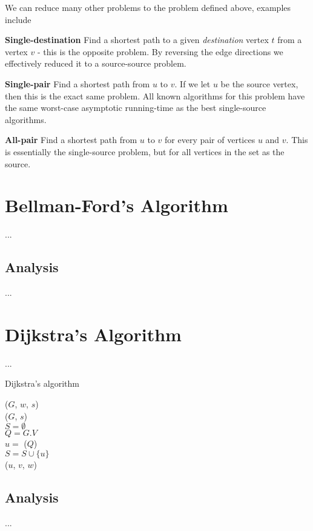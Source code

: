 We can reduce many other problems to the problem defined above, examples
include
\begin{description}
	\item \textbf{Single-destination} Find a shortest path to a given
\textit{destination} vertex $t$ from a vertex $v$ - this is the opposite
problem. By reversing the edge directions we effectively reduced it to a
source-source problem.
	\item \textbf{Single-pair} Find a shortest path from $u$ to $v$. If we let
$u$ be the source vertex, then this is the exact same problem. All known
algorithms for this problem have the same worst-case asymptotic running-time
as the best single-source algorithms. %
	\item \textbf{All-pair} Find a shortest path from $u$ to $v$ for every
pair of vertices $u$ and $v$. This is essentially the single-source problem,
but for all vertices in the set as the source.
\end{description}

\newpage
\section{Bellman-Ford's Algorithm}
...

\subsection{Analysis}
...

\newpage
\section{Dijkstra's Algorithm}
...
\begin{algorithm}
	\caption{Dijkstra's algorithm}
	\label{alg:dijkstra}
	
	
	
	
	\BlankLine
	\Dijkstra($G$, $w$, $s$) \\
	\Begin
	{
		\InitSingleSource($G$, $s$) \\
		$S = \emptyset$ \\
		$Q = G.V$ \\
		{
			$u = $ \ExtractMin($Q$) \\
			$S = S \cup \{u\}$ \\
			{
				\Relax($u$, $v$, $w$)
			}
		}
	}
\end{algorithm}

\subsection{Analysis}
...

